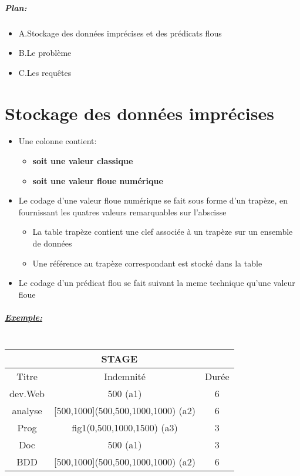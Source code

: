 \documentclass[10pt,a4paper]{report}
\begin{document}
\paragraph{Plan:\\}
\begin{itemize}
	\item A.Stockage des données imprécises et des prédicats flous
	\item B.Le problème
	\item C.Les requêtes
\end{itemize}

\chapter{Stockage des données imprécises \\}
\begin{itemize}
\item Une colonne contient:
\begin{itemize}
\item \textbf{soit une valeur classique}
\item \textbf{soit une valeur floue numérique}
\end{itemize}
\item Le codage d'une valeur floue numérique se fait sous forme d'un trapèze, en fournissant les quatres valeurs remarquables sur l'abscisse
\begin{itemize}
\item La table trapèze contient une clef associée à un trapèze sur un ensemble de données
\item Une référence au trapèze correspondant est stocké dans la table
\end{itemize}
\item Le codage d'un prédicat flou se fait suivant la meme technique qu'une valeur floue
\end{itemize}

\paragraph{\underline{Exemple:} \\\\}

\begin{tabular}{|c|c|c|}
\hline
\multicolumn{3}{|c|}{STAGE}\\
\hline 
Titre & Indemnité & Durée \\ 
\hline 
dev.Web & 500 (a1) & 6 \\ 
\hline 
analyse & [500,1000](500,500,1000,1000) (a2) & 6 \\ 
\hline 
Prog & fig1(0,500,1000,1500) (a3) & 3 \\ 
\hline 
Doc & 500 (a1) & 3 \\ 
\hline 
BDD & [500,1000](500,500,1000,1000) (a2) & 6 \\ 
\hline
\end{tabular} 
\end{document}
